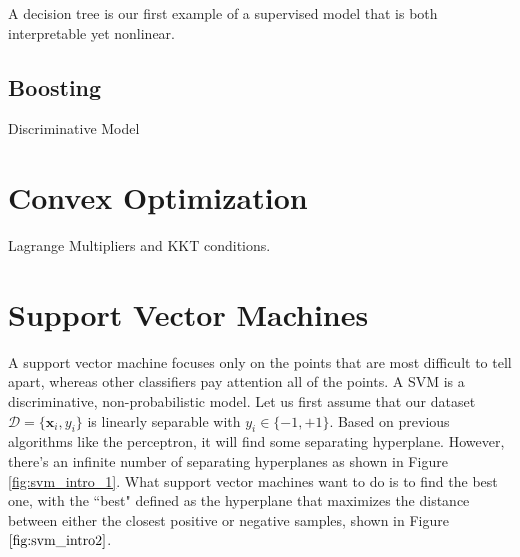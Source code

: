 \documentclass{article}
\theoremstyle{definition}
\begin{document}
    A decision tree is our first example of a supervised model that is both interpretable yet nonlinear. 


  \subsection{Boosting}



  Discriminative Model

\section{Convex Optimization}

  Lagrange Multipliers and KKT conditions. 

\section{Support Vector Machines}

  A support vector machine focuses only on the points that are most difficult to tell apart, whereas other classifiers pay attention all of the points. A SVM is a discriminative, non-probabilistic model. Let us first assume that our dataset $\mathcal{D} = \{\mathbf{x}_i, y_i\}$ is linearly separable with $y_i \in \{-1, +1\}$. Based on previous algorithms like the perceptron, it will find some separating hyperplane. However, there's an infinite number of separating hyperplanes as shown in Figure \ref{fig:svm_intro_1}. What support vector machines want to do is to find the best one, with the ``best" defined as the hyperplane that maximizes the distance between either the closest positive or negative samples, shown in Figure $\ref{fig:svm_intro2}$.  
\end{document}
